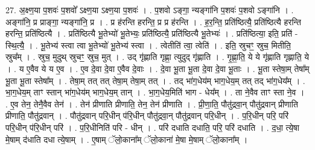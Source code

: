 \documentclass[17pt]{extarticle}
\begin{document}
27. अ॒क्ष्ण॒या प॒शवः॑ प॒शवो᳚ ऽक्ष्ण॒या ऽक्ष्ण॒या प॒शवः॑ । . प॒शवो ऽङ्गा॒ न्यङ्गा॑नि प॒शवः॑ प॒शवो ऽङ्गा॑नि । . अङ्गा॑नि॒ प्र प्राङ्गा॒ न्यङ्गा॑नि॒ प्र । . प्र ह॑रन्ति हरन्ति॒ प्र प्र ह॑रन्ति । . ह॒र॒न्ति॒ प्रति॑ष्ठित्यै॒ प्रति॑ष्ठित्यै हरन्ति हरन्ति॒ प्रति॑ष्ठित्यै । . प्रति॑ष्ठित्यै भू॒तेभ्यो॑ भू॒तेभ्यः॒ प्रति॑ष्ठित्यै॒ प्रति॑ष्ठित्यै भू॒तेभ्यः॑ । . प्रति॑ष्ठित्या॒ इति॒ प्रति॑ - स्थि॒त्यै॒ । . भू॒तेभ्य॑ स्त्वा त्वा भू॒तेभ्यो॑ भू॒तेभ्य॑ स्त्वा । . त्वेतीति॑ त्वा॒ त्वेति॑ । . इति॒ स्रुचꣳ॒॒ स्रुच॒ मितीति॒ स्रुच᳚म् । . स्रुच॒ मुदुथ् स्रुचꣳ॒॒ स्रुच॒ मुत् । . उद् गृ॑ह्णाति गृह्णा॒ त्युदुद् गृ॑ह्णाति । . गृ॒ह्णा॒ति॒ ये ये गृ॑ह्णाति गृह्णाति॒ ये । . य ए॒वैव ये य ए॒व । . ए॒व दे॒वा दे॒वा ए॒वैव दे॒वाः । . दे॒वा भू॒ता भू॒ता दे॒वा दे॒वा भू॒ताः । . भू॒ता स्तेषा॒म् तेषा᳚म् भू॒ता भू॒ता स्तेषा᳚म् । . तेषा॒म् तत् तत् तेषा॒म् तेषा॒म् तत् । . तद् भा॑ग॒धेय॑म् भाग॒धेय॒म् तत् तद् भा॑ग॒धेय᳚म् । . भा॒ग॒धेय॒म् ताꣳ स्तान् भा॑ग॒धेय॑म् भाग॒धेय॒म् तान् । . भा॒ग॒धेय॒मिति॑ भाग - धेय᳚म् । . ता ने॒वैव ताꣳ स्ता ने॒व । . ए॒व तेन॒ तेनै॒वैव तेन॑ । . तेन॑ प्रीणाति प्रीणाति॒ तेन॒ तेन॑ प्रीणाति । . प्री॒णा॒ति॒ पौतु॑द्रवा॒न् पौतु॑द्रवान् प्रीणाति प्रीणाति॒ पौतु॑द्रवान् । . पौतु॑द्रवान् परि॒धीन् प॑रि॒धीन् पौतु॑द्रवा॒न् पौतु॑द्रवान् परि॒धीन् । . प॒रि॒धीन् परि॒ परि॑ परि॒धीन् प॑रि॒धीन् परि॑ । . प॒रि॒धीनिति॑ परि - धीन् । . परि॑ दधाति दधाति॒ परि॒ परि॑ दधाति । . द॒धा॒ त्ये॒षा मे॒षाम् द॑धाति दधा त्ये॒षाम् । . ए॒षाम् ॅलो॒काना᳚म् ॅलो॒काना॑ मे॒षा मे॒षाम् ॅलो॒काना᳚म् । \newline
\end{document}
